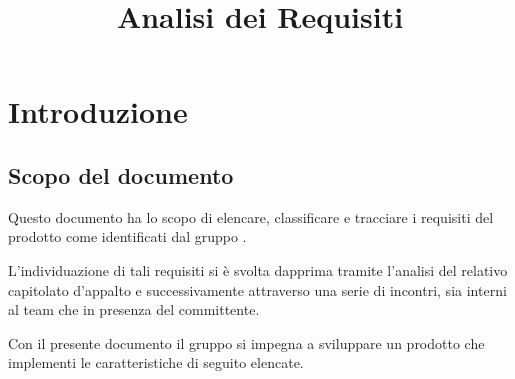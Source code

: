 


\author{\AZ}
\supervisor{\GG}
\dest{\TV, \RC, \ZU}
\title{Analisi dei Requisiti}


\maketitle

\tableofcontents
\listoffigures



\newcommand{\myimg}[1] {
	\begin{figure}[H]
		\makebox[\textwidth][c] {
			\texttt{[image: Diagrammi casi d'uso/\#1]}
		}
		\caption{#1}
		\label{#1}
	\end{figure}
}

\newcommand{\myimgsmall}[1] {
	\begin{figure}[H]
		\makebox[\textwidth][c] {
			\texttt{[image: Diagrammi casi d'uso/\#1]}
		}
		\caption{#1}
		\label{#1}
	\end{figure}
}

\newcommand{\myimgvsmall}[1] {
	\begin{figure}[H]
		\makebox[\textwidth][c] {
			\texttt{[image: Diagrammi casi d'uso/\#1]}
		}
		\caption{#1}
		\label{#1}
	\end{figure}
}






\section{Introduzione}

\subsection{Scopo del documento}
Questo documento ha lo scopo di elencare, classificare e tracciare i requisiti del prodotto \proj{} come identificati dal gruppo \hx{}.

L'individuazione di tali requisiti si è svolta dapprima tramite l'analisi del relativo capitolato d'appalto e successivamente attraverso una serie di incontri, sia interni al team che in presenza del committente.

Con il presente documento il gruppo \hx{} si impegna a sviluppare un prodotto che implementi le caratteristiche di seguito elencate.

